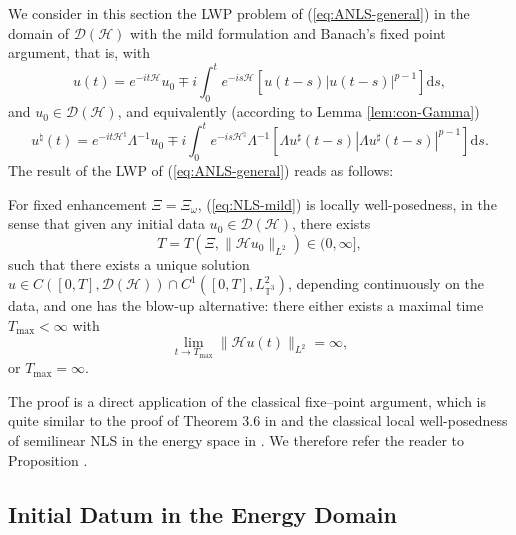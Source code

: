 We consider in this section the LWP problem of
(\ref{eq:ANLS-general}) in the domain of $\mathcal{D} (\mathcal{H})$ with the
mild formulation and Banach's fixed point argument, that is, with
\begin{equation}
  u (t) = e^{- it \mathcal{H}} u_0 \mp i \int_0^t e^{- i s \mathcal{H}} [u (t
  - s) |u (t - s) |^{p - 1}] \mathrm{d}s, \label{eq:NLS-mild}
\end{equation}
and $u_0 \in \mathcal{D} (\mathcal{H})$, and equivalently (according to Lemma
\ref{lem:con-Gamma})
\begin{equation}
  u^{\natural} (t) = e^{- it \mathcal{H}^{\natural}} \Lambda^{- 1} u_0 \mp i
  \int_0^t e^{- i s \mathcal{H}^{\natural}} \Lambda^{- 1} [\Lambda u^{\sharp}
  (t - s) | \Lambda u^{\sharp} (t - s) |^{p - 1}] \mathrm{d}s .
  \label{eq:main_mild_sharp}
\end{equation}
The result of the LWP of (\ref{eq:ANLS-general}) reads as follows:

\begin{prop}
  \label{prop-lwp-domain}For fixed enhancement $\Xi = \Xi_{\omega}$,
  (\ref{eq:NLS-mild}) is locally well-posedness, in the sense that given any
  initial data $u_0 \in \mathcal{D} (\mathcal{H})$, there exists
  \[ T = T (\Xi, \| \mathcal{H} u_0 \|_{L^2}) \in (0, \infty], \]
  such that there exists a unique solution $u \in C ([0, T], \mathcal{D}
  (\mathcal{H})) \cap C^1 ([0, T], L_{\mathbb{T}^3}^2)$, depending
  continuously on the data, and one has the blow-up alternative: there either
  exists a maximal time $T_{\max} < \infty$ with
  \begin{equation}
    \lim_{t \to T_{\max}} \| \mathcal{H} u (t) \|_{L^2} = \infty,
    \label{eq:blow-up-T-}
  \end{equation}
  or $T_{\max} = \infty$.
\end{prop}
The proof is a direct application of the classical fixe--point argument, which is quite similar to the proof of Theorem 3.6 in {\cite{GUZ20}} and the classical local well-posedness of semilinear NLS in the energy space in \cite{cazenave2003semilinear}. We therefore refer the reader to Proposition \cite[Proposition 4.1]{de2025stochastic}. 

\subsection{Initial Datum in the Energy Domain}\label{sec:LWPenergy}

